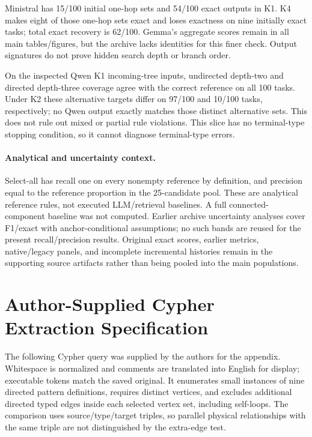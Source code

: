 Ministral has 15/100 initial one-hop sets and 54/100 exact outputs in K1. K4 makes eight of those one-hop sets exact and loses exactness on nine initially exact tasks; total exact recovery is 62/100. Gemma's aggregate scores remain in all main tables/figures, but the archive lacks identities for this finer check. Output signatures do not prove hidden search depth or branch order.

On the inspected Qwen K1 incoming-tree inputs, undirected depth-two and directed depth-three coverage agree with the correct reference on all 100 tasks. Under K2 these alternative targets differ on 97/100 and 10/100 tasks, respectively; no Qwen output exactly matches those distinct alternative sets. This does not rule out mixed or partial rule violations. This slice has no terminal-type stopping condition, so it cannot diagnose terminal-type errors.

\paragraph{Analytical and uncertainty context.}
Select-all has recall one on every nonempty reference by definition, and precision equal to the reference proportion in the 25-candidate pool. These are analytical reference rules, not executed LLM/retrieval baselines. A full connected-component baseline was not computed. Earlier archive uncertainty analyses cover F1/exact with anchor-conditional assumptions; no such bands are reused for the present recall/precision results. Original exact scores, earlier metrics, native/legacy panels, and incomplete incremental histories remain in the supporting source artifacts rather than being pooled into the main populations.

\section{Author-Supplied Cypher Extraction Specification}
\label{app:cypher}
The following Cypher query was supplied by the authors for the appendix. Whitespace is normalized and comments are translated into English for display; executable tokens match the saved original. It enumerates small instances of nine directed pattern definitions, requires distinct vertices, and excludes additional directed typed edges inside each selected vertex set, including self-loops. The comparison uses source/type/target triples, so parallel physical relationships with the same triple are not distinguished by the extra-edge test.

